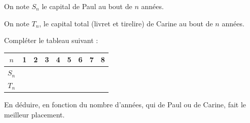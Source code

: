 \documentclass[a4paper,11pt]{exam}
\begin{document}
\begin{questions}
	\question[2] 
	On note $S_n$ le capital de Paul au bout de $n$ années.
	
	\question[2] On note $T_n$, le capital total (livret et tirelire) de Carine au bout de $n$ années.
	
	\question[1] Compléter le tableau suivant :
	
	\begin{center}
		
		\begin{tabular}{|@{$\quad $}c@{$\quad $}| @{$\qquad $}c@{$\qquad $} | @{$\qquad $}c@{$\qquad $} | @{$\qquad $}c@{$\qquad $} | @{$\qquad $}c@{$\qquad $} |@{$\qquad $}c@{$\qquad $} |@{$\qquad $}c@{$\qquad $} |@{$\qquad $}c@{$\qquad $}|@{$\qquad $}c@{$\qquad $}|}
			\hline
			$n$                           & 1 & 2 & 3 & 4 & 5 & 6 & 7 & 8 \\ \hline
			$S_n$ &   &   &   &   &   &   &   &   \\ \hline
			$T_n$ &   &   &   &   &   &   &   &   \\ \hline
		\end{tabular}
	\end{center}
	
	\question[1] En déduire, en fonction du nombre d'années, qui de Paul ou de Carine, fait le meilleur placement.
	
\end{questions}
\end{document}
